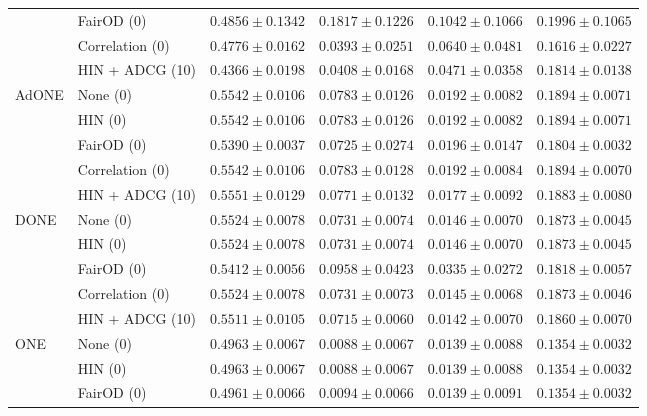 \documentclass[sigconf,natbib=false]{acmart}
\begin{document}
\begin{table}[ht]
{\begin{tabular}{llcccc}
  & FairOD (0)        & $0.4856 \pm 0.1342$ & $0.1817 \pm 0.1226$ & $0.1042 \pm 0.1066$ & $0.1996 \pm 0.1065$ \\
  & Correlation (0)   & $0.4776 \pm 0.0162$ & $\mathbf{0.0393 \pm 0.0251}$ & $0.0640 \pm 0.0481$ & $0.1616 \pm 0.0227$ \\
  & HIN + ADCG (10)   & $0.4366 \pm 0.0198$ & $0.0408 \pm 0.0168$ & $0.0471 \pm 0.0358$ & $0.1814 \pm 0.0138$ \\
\midrule
\multirow{5}{*}{AdONE}
  & None (0)          & \underline{$0.5542 \pm 0.0106$} & $0.0783 \pm 0.0126$ & $\mathbf{0.0192 \pm 0.0082}$ & \underline{$0.1894 \pm 0.0071$} \\
  & HIN (0)           & $0.5542 \pm 0.0106$ & $0.0783 \pm 0.0126$ & $0.0192 \pm 0.0082$ & $0.1894 \pm 0.0071$ \\
  & FairOD (0)        & $0.5390 \pm 0.0037$ & $\mathbf{0.0725 \pm 0.0274}$ & $0.0196 \pm 0.0147$ & $0.1804 \pm 0.0032$ \\
  & Correlation (0)   & $0.5542 \pm 0.0106$ & $0.0783 \pm 0.0128$ & $0.0192 \pm 0.0084$ & $0.1894 \pm 0.0070$ \\
  & HIN + ADCG (10)   & $0.5551 \pm 0.0129$ & $0.0771 \pm 0.0132$ & $0.0177 \pm 0.0092$ & $0.1883 \pm 0.0080$ \\
\midrule
\multirow{5}{*}{DONE}
  & None (0)          & \underline{$0.5524 \pm 0.0078$} & $0.0731 \pm 0.0074$ & $0.0146 \pm 0.0070$ & \underline{$0.1873 \pm 0.0045$} \\
  & HIN (0)           & $0.5524 \pm 0.0078$ & $0.0731 \pm 0.0074$ & $0.0146 \pm 0.0070$ & $0.1873 \pm 0.0045$ \\
  & FairOD (0)        & $0.5412 \pm 0.0056$ & $0.0958 \pm 0.0423$ & $0.0335 \pm 0.0272$ & $0.1818 \pm 0.0057$ \\
  & Correlation (0)   & $0.5524 \pm 0.0078$ & $\mathbf{0.0731 \pm 0.0073}$ & $\mathbf{0.0145 \pm 0.0068}$ & $0.1873 \pm 0.0046$ \\
  & HIN + ADCG (10)   & $0.5511 \pm 0.0105$ & $0.0715 \pm 0.0060$ & $0.0142 \pm 0.0070$ & $0.1860 \pm 0.0070$ \\
\midrule
\multirow{5}{*}{ONE}
  & None (0)          & \underline{$0.4963 \pm 0.0067$} & $\mathbf{0.0088 \pm 0.0067}$ & $\mathbf{0.0139 \pm 0.0088}$ & \underline{$0.1354 \pm 0.0032$} \\
  & HIN (0)           & $0.4963 \pm 0.0067$ & $0.0088 \pm 0.0067$ & $0.0139 \pm 0.0088$ & $0.1354 \pm 0.0032$ \\
  & FairOD (0)        & $0.4961 \pm 0.0066$ & $0.0094 \pm 0.0066$ & $0.0139 \pm 0.0091$ & $0.1354 \pm 0.0032$ \\

\end{tabular}}
\end{table}
\end{document}
